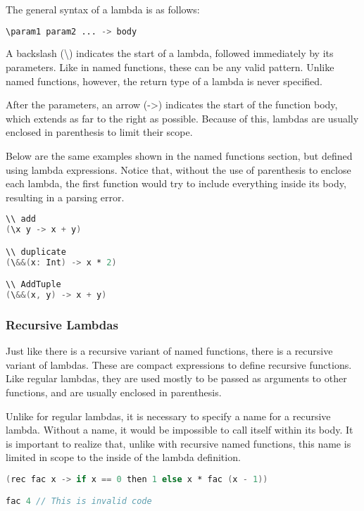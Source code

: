 \documentclass{article}
\begin{document}
The general syntax of a lambda is as follows:

\begin{lstlisting}[language=V, escapechar=&]
\param1 param2 ... -> body
\end{lstlisting}

A backslash (\textbackslash) indicates the start of a lambda, followed immediately by its parameters.
Like in named functions, these can be any valid pattern.
Unlike named functions, however, the return type of a lambda is never specified.

After the parameters, an arrow (->) indicates the start of the function body, which extends as far to the right as possible.
Because of this, lambdas are usually enclosed in parenthesis to limit their scope.

Below are the same examples shown in the named functions section, but defined using lambda expressions.
Notice that, without the use of parenthesis to enclose each lambda, the first function would try to include everything inside its body, resulting in a parsing error.

\begin{lstlisting}[language=V, escapechar=&]
\\ add
(\x y -> x + y)

\\ duplicate
(\&&(x: Int) -> x * 2)

\\ AddTuple
(\&&(x, y) -> x + y)
\end{lstlisting}

\subsubsection{Recursive Lambdas}

Just like there is a recursive variant of named functions, there is a recursive variant of lambdas.
These are compact expressions to define recursive functions.
Like regular lambdas, they are used mostly to be passed as arguments to other functions, and are usually enclosed in parenthesis.

Unlike for regular lambdas, it is necessary to specify a name for a recursive lambda.
Without a name, it would be impossible to call itself within its body.
It is important to realize that, unlike with recursive named functions, this name is limited in scope to the inside of the lambda definition.

\begin{lstlisting}[language=V]
(rec fac x -> if x == 0 then 1 else x * fac (x - 1))

fac 4 // This is invalid code
\end{lstlisting}
\end{document}
